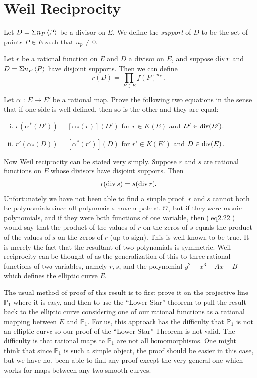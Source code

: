 \section{Weil Reciprocity}
\label{sec2.7}

Let $ D=\Sigma n_{P}\left\langle P \right \rangle$ be a divisor on $E$. We define the {\it support} of $D$ to be the set of points $P\in E$ such that $n_{p}\neq 0$.

\begin{defi}
\label{d2.7.14}
Let $r$ be a rational function on $E$ and $D$ a divisor on $E$, and suppose $\operatorname{div}r$ and $ D=\Sigma n_{P}\left\langle P \right \rangle$ have disjoint supports. Then we can define
$$
r(D)=\prod_{P\in E}f(P)^{n_{P}}\ .
$$
\end{defi}

\begin{exo}
\label{e2.7.9}
Let $\alpha$ : $E\rightarrow E'$ be a rational map. Prove the following two equations in the sense that if one side is well-defined, then so is the other and they are equal:
\begin{enumerate}[(i)]
\item
$r(\alpha^{*}(D'))=[\alpha_{*}(r)](D')$ for $r\in K(E)$ and $D'\in \operatorname{div}(E')$.
\item
$r'(\alpha_{*}(D))=[\alpha^{*}(r')](D)$ for $r'\in K(E')$ and $D\in \operatorname{div}(E)$.
\end{enumerate}
\end{exo}

Now Weil reciprocity can be stated very simply. Suppose $r$ and $s$ are rational functions on $E$ whose divisors have disjoint supports. Then
\begin{equation}
\label{eq2.22}
r(\operatorname{div} s)=s (\operatorname{div} r) .
\end{equation}
Unfortunately we have not been able to find a simple proof. $r$ and $s$ cannot both be polynomials since all polynomials have a pole at $\mathcal{O}$, but if they were monic polynomials, and if they were both functions of one variable, then (\ref{eq2.22}) would say that the product of the values of $r$ on the zeros of $s$ equals the product of the values of $s$ on the zeros of $r$ (up to sign). This is well-known to be true. It is merely the fact that the resultant of two polynomials is symmetric. Weil reciprocity can be thought of as the generalization of this to three rational functions of two variables, namely $r,s$, and the polynomial $y^{2}-x^{3}- Ax- B$ which defines the elliptic curve $E$.

The usual method of proof of this result is to first prove it on the projective line $\mathbb{P}_{1}$ where it is easy, and then to use the ``Lower Star'' theorem to pull the result back to the elliptic curve considering one of our rational functions as a rational mapping between $E$ and $\mathbb{P}_{1}$. For us, this approach has the difficulty that $\mathbb{P}_{1}$ is not an elliptic curve so our proof of the ``Lower Star'' Theorem is not valid. The difficulty is that rational maps to $\mathbb{P}_{1}$ are not all homomorphisms. One might think that since $\mathbb{P}_{1}$ is such a simple object, the proof should be easier in this case, but we have not been able to find any proof except the very general one which works for maps between any two smooth curves.

